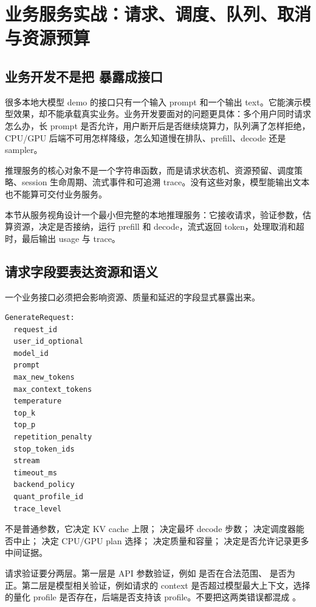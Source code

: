 \section{业务服务实战：请求、调度、队列、取消与资源预算}

\subsection{业务开发不是把  暴露成接口}

很多本地大模型 demo 的接口只有一个输入 prompt 和一个输出 text。它能演示模型效果，却不能承载真实业务。业务开发要面对的问题更具体：多个用户同时请求怎么办，长 prompt 是否允许，用户断开后是否继续烧算力，队列满了怎样拒绝，CPU/GPU 后端不可用怎样降级，怎么知道慢在排队、prefill、decode 还是 sampler。

\begin{keyidea}
推理服务的核心对象不是一个字符串函数，而是请求状态机、资源预留、调度策略、session 生命周期、流式事件和可追溯 trace。没有这些对象，模型能输出文本也不能算可交付业务服务。
\end{keyidea}

本节从服务视角设计一个最小但完整的本地推理服务：它接收请求，验证参数，估算资源，决定是否接纳，运行 prefill 和 decode，流式返回 token，处理取消和超时，最后输出 usage 与 trace。

\subsection{请求字段要表达资源和语义}

一个业务接口必须把会影响资源、质量和延迟的字段显式暴露出来。

\begin{lstlisting}[numbers=none,caption={GenerateRequest 的业务字段}]
GenerateRequest:
  request_id
  user_id_optional
  model_id
  prompt
  max_new_tokens
  max_context_tokens
  temperature
  top_k
  top_p
  repetition_penalty
  stop_token_ids
  stream
  timeout_ms
  backend_policy
  quant_profile_id
  trace_level
\end{lstlisting}

 不是普通参数，它决定 KV cache 上限； 决定最坏 decode 步数； 决定调度器能否中止； 决定 CPU/GPU plan 选择； 决定质量和容量； 决定是否允许记录更多中间证据。

请求验证要分两层。第一层是 API 参数验证，例如  是否在合法范围、 是否为正。第二层是模型相关验证，例如请求的 context 是否超过模型最大上下文，选择的量化 profile 是否存在，后端是否支持该 profile。不要把这两类错误都混成 。

